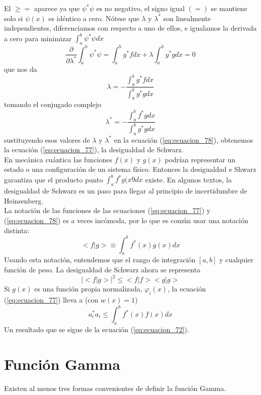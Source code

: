 El $\geq =$ aparece ya que $\psi^{*} \psi$ es no negativo, el signo igual $(=)$ se mantiene solo si $\psi(x)$ es idéntico a cero. Nótese que $\lambda$ y $\lambda^{*}$ son linealmente independientes, diferenciamos con respecto a uno de ellos, e igualamos la derivada a cero para minimizar $\int_{a}^{b} \psi^{*} \psi dx$
\begin{equation*}
\dfrac{\partial}{\partial \lambda^{*}} \int_{a}^{b} \psi^{*} \psi = \int_{a}^{b} g^{*} f dx  + \lambda \int_{a}^{b} g^{*} g dx = 0
\end{equation*}
que nos da
\begin{equation}
\lambda = - \dfrac{\int_{a}^{b} g^{*} f dx}{\int_{a}^{b} g^{*} g dx}
\label{eq:ecuacion_79a}
\end{equation}
tomando el conjugado complejo 
\begin{equation}
\lambda^{*} = - \dfrac{\int_{a}^{b} f^{*} g dx}{\int_{a}^{b} g^{*} g dx}
\label{eq:ecuacion_79b}
\end{equation}
sustituyendo esos valores de $\lambda$ y $\lambda^{*}$ en la ecuación (\ref{eq:ecuacion_78}), obtenemos la ecuación (\ref{eq:ecuacion_77}), la desigualdad de Schwarz.
\\
En mecánica cuántica las funciones $f(x)$ y $g(x)$ podrían representar un estado o una configuración de un sistema físico. Entonces la desigualdad e Shwarz garantiza que el producto punto $\int_{a}^{b} f^{*} g(x9 dx$ existe. En algunos textos, la desigualdad de Schwarz es un paso para llegar al principio de incertidumbre de Heinsenberg.
\\
La notación de las funciones de las ecuaciones (\ref{eq:ecuacion_77}) y (\ref{eq:ecuacion_78}) es a veces incómoda, por lo que es común usar una notación distinta:
\[ < f \vert g > \equiv \int_{a}^{b} f^{*}(x) g(x) dx \]
Usando esta notación, entendemos que el rango de integración $[a,b]$ y cualquier función de peso. La desigualdad de Schwarz ahora se representa
\begin{equation}
\vert <f \vert g > \vert^{2} \leq < f \vert f > < g \vert g >
\label{eq:ecuacion_77a}
\end{equation}
Si $g(x)$ es una función propia normalizada, $\varphi_{i}(x)$, la ecuación (\ref{eq:ecuacion_77}) lleva a (con $w(x)=1$)
\begin{equation}
a_{i}^{*} a_{i} \leq \int_{a}^{b} f^{*}(x) f(x) dx 
\label{eq:ecuacion_80}
\end{equation}
Un resultado que se sigue de la ecuación (\ref{eq:ecuacion_72}).
\section{Función Gamma}
Existen al menos tres formas convenientes de definir la función Gamma.
